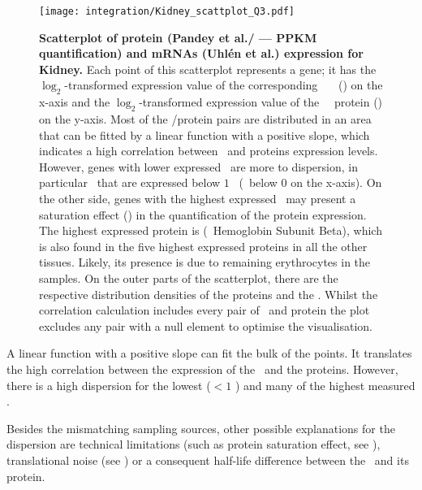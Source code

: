 
\begin{figure}[!htbp]
    \texttt{[image: integration/Kidney\_scattplot\_Q3.pdf]}\centering
    \caption[Scatterplot of protein (Pandey et al./ --- PPKM quantification)
    and mRNA (Uhlén \etal) expression for Kidney]
    {\label{fig:ScatKid}\textbf{Scatterplot of
    protein (Pandey et al./ --- PPKM quantification) and mRNAs (Uhlén et al.)
    expression for Kidney.}
    Each point of this scatterplot represents a gene;
    it has the $\log_2$-transformed expression value
    of the corresponding \uhlen\ \etal\ \mRNA\ (\FPKM) on the x-axis and
    the $\log_2$-transformed expression value of
    the \pandey\ \etal\ protein (\PPKM) on the y-axis.
    Most of the \mRNA/protein pairs are distributed in an area
    that can be fitted by a linear function with a positive slope,
    which indicates a high correlation between \mRNAs\ and proteins expression
    levels.
    However, genes with lower expressed \mRNAs\ are more to dispersion,
    in particular \mRNAs\ that are expressed below $1$ \FPKM\ (\ie\ below $0$ on
    the x-axis).
    On the other side, genes with the highest expressed \mRNAs\ may present
    a saturation effect ()
    in the quantification of the protein expression.
    The highest expressed protein is 
    (\ie\ Hemoglobin Subunit Beta), which is also found in
    the five highest expressed proteins in all the other tissues.
    Likely, its presence is due to remaining erythrocytes in the samples.
    On the outer parts of the scatterplot,
    there are the respective distribution densities of the proteins and the \mRNAs.
    Whilst the correlation calculation includes every pair of \mRNA\ and protein
    the plot excludes any pair with a null element to optimise the visualisation.}
\end{figure}

A linear function with a positive slope can fit the bulk of the points.
It translates the high correlation between the expression
of the \mRNAs\ and the proteins.
However, there is a high dispersion for the lowest ($<1$ \FPKM)
and many of the highest measured \mRNAs{}.

Besides the mismatching sampling sources,
other possible explanations for the dispersion are
technical limitations (such as protein saturation effect, see ),
translational noise (see )
or a consequent half-life difference between the \mRNA\ and its protein.

